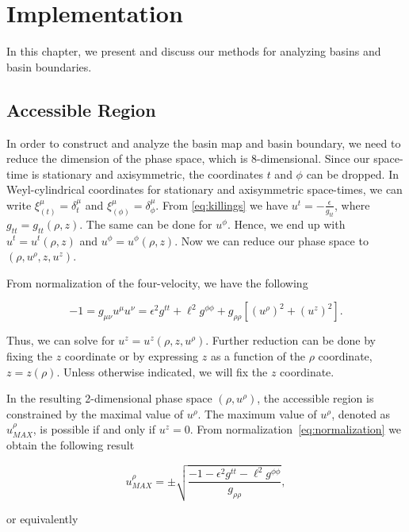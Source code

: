 \chapter{Implementation}
\label{chap:implementation}
In this chapter, we present and discuss our methods for analyzing basins and basin boundaries.

\section{Accessible Region}
In order to construct and analyze the basin map and basin boundary, we need to reduce the dimension of the phase space, which is 8-dimensional. Since our space-time is stationary and axisymmetric, the coordinates $t$ and $\phi$ can be dropped. In Weyl-cylindrical coordinates for stationary and axisymmetric space-times, we can write $\xi^\mu_{(t)} = \delta^\mu_t$ and $\xi^\mu_{(\phi)} = \delta^\mu_\phi$. From \eqref{eq:killings} we have $u^t = -\frac{\epsilon}{g_{tt}}$, where $g_{tt} = g_{tt}(\rho,z)$. The same can be done for $u^{\phi}$. Hence, we end up with $u^t = u^t(\rho, z)$ and $u^\phi = u^\phi(\rho,z)$. Now we can reduce our phase space to $(\rho,u^\rho,z, u^z)$.

From normalization of the four-velocity, we have the following

\begin{equation}
    -1 = g_{\mu\nu}u^{\mu}u^{\nu} = \epsilon^2g^{tt}+\ell^2g^{\phi\phi} + g_{\rho\rho}[(u^\rho)^2+(u^z)^2].
    \label{eq:normalization}
\end{equation}

Thus, we can solve for \(u^z = u^z(\rho,z,u^\rho)\). Further reduction can be done by fixing the \(z\) coordinate or by expressing \(z\) as a function of the \(\rho\) coordinate, \(z=z(\rho)\). Unless otherwise indicated, we will fix the \(z\) coordinate. 

In the resulting 2-dimensional phase space $(\rho,u^\rho)$, the accessible region is constrained by the maximal value of $u^\rho$. The maximum value of $u^\rho$, denoted as $u^\rho_{MAX}$, is possible if and only if $u^z=0$. From normalization~\eqref{eq:normalization} we obtain the following result

\begin{equation}
    u^\rho_{MAX} = \pm \sqrt{\frac{-1-\epsilon^2g^{tt}-\ell^2g^{\phi\phi}}{g_{\rho\rho}}},
    \label{eq:urhomax}
\end{equation}

or equivalently

